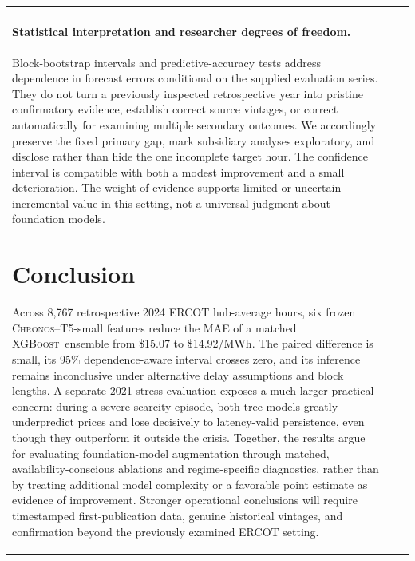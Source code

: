 \documentclass[11pt,letterpaper]{article}
\newcommand{\MWh}{\ensuremath{\mathrm{MWh}}}
\newcommand{\Chronos}{\textsc{Chronos}}
\newcommand{\XGB}{\textsc{XGBoost}}
\begin{document}
\begin{table}[t]
\begin{tabularx}{\linewidth}{@{}>{\raggedright\arraybackslash}p{2.45cm}>{\raggedright\arraybackslash}X>{\raggedright\arraybackslash}p{2.45cm}@{}}
\paragraph{Statistical interpretation and researcher degrees of freedom.} Block-bootstrap intervals and predictive-accuracy tests address dependence in forecast errors conditional on the supplied evaluation series. They do not turn a previously inspected retrospective year into pristine confirmatory evidence, establish correct source vintages, or correct automatically for examining multiple secondary outcomes. We accordingly preserve the fixed primary gap, mark subsidiary analyses exploratory, and disclose rather than hide the one incomplete target hour. The confidence interval is compatible with both a modest improvement and a small deterioration. The weight of evidence supports limited or uncertain incremental value in this setting, not a universal judgment about foundation models.

\section{Conclusion}\label{sec:conclusion}
Across 8,767 retrospective 2024 ERCOT hub-average hours, six frozen \Chronos--T5-small features reduce the MAE of a matched \XGB\ ensemble from \$15.07 to \$14.92/\MWh. The paired difference is small, its 95\% dependence-aware interval crosses zero, and its inference remains inconclusive under alternative delay assumptions and block lengths. A separate 2021 stress evaluation exposes a much larger practical concern: during a severe scarcity episode, both tree models greatly underpredict prices and lose decisively to latency-valid persistence, even though they outperform it outside the crisis. Together, the results argue for evaluating foundation-model augmentation through matched, availability-conscious ablations and regime-specific diagnostics, rather than by treating additional model complexity or a favorable point estimate as evidence of improvement. Stronger operational conclusions will require timestamped first-publication data, genuine historical vintages, and confirmation beyond the previously examined ERCOT setting.


\end{tabularx}
\end{table}
\end{document}
